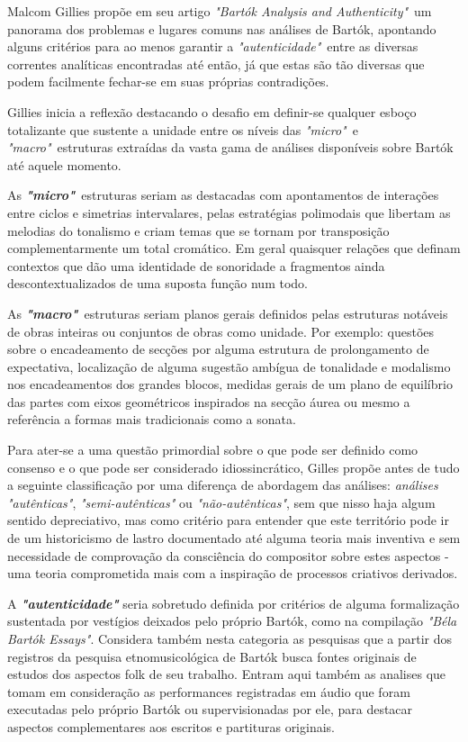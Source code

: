\documentclass[
	12pt,				%
	openright,			%
	twoside,			%
	a4paper,			%
	english,			%
	french,				%
	spanish,			%
	brazil				%
	]{abntex2}
\begin{document}
Malcom Gillies propõe em seu artigo \textit{"Bartók Analysis and Authenticity"}\cite{gillies1995bartok}\ um panorama dos problemas e lugares comuns nas análises de Bartók, apontando alguns critérios para ao menos garantir a \textit{"autenticidade"}\ entre as diversas correntes analíticas encontradas até então, já que estas são tão diversas que podem facilmente fechar-se em suas próprias contradições. 

Gillies inicia a reflexão destacando o desafio em definir-se qualquer esboço totalizante que sustente a unidade entre os níveis das \textit{ "micro"}\ e \textit{"macro"}\ estruturas extraídas da vasta gama de análises disponíveis sobre Bartók até aquele momento.

As \textit{ \textbf{"micro"}}\ estruturas seriam as destacadas com apontamentos de interações entre ciclos e simetrias intervalares, pelas estratégias polimodais que libertam as melodias do tonalismo e criam temas que se tornam por transposição complementarmente um total cromático. Em geral quaisquer relações que definam contextos que dão uma identidade de sonoridade a fragmentos ainda descontextualizados de uma suposta função num todo. 

As \textit{\textbf{"macro"}}\ estruturas seriam planos gerais definidos pelas estruturas notáveis de obras inteiras ou conjuntos de obras como unidade. Por exemplo: questões sobre o encadeamento de secções por alguma estrutura de prolongamento de expectativa, localização de alguma sugestão ambígua de tonalidade e modalismo nos encadeamentos dos grandes blocos, medidas gerais de um plano de equilíbrio das partes com eixos geométricos inspirados na secção áurea ou mesmo a referência a formas mais tradicionais como a sonata.

Para ater-se a uma questão primordial sobre o que pode ser definido como consenso e o que pode ser considerado idiossincrático, Gilles propõe antes de tudo a seguinte classificação por uma diferença de abordagem das análises: \textit{análises "autênticas"}, \textit{"semi-autênticas"} ou \textit{"não-autênticas"}, sem que nisso haja algum sentido depreciativo, mas como critério para entender que este território pode ir de um historicismo de lastro documentado até alguma teoria mais inventiva e sem necessidade de comprovação da consciência do compositor sobre estes aspectos - uma teoria comprometida mais com a inspiração de processos criativos derivados.

A \textit{\textbf{"autenticidade"}} seria sobretudo definida por critérios de alguma formalização sustentada por vestígios deixados pelo próprio Bartók, como na compilação \textit{"Béla Bartók Essays"}\cite{bartok1993bela}. Considera também nesta categoria as pesquisas que a partir dos registros da pesquisa etnomusicológica de Bartók busca fontes originais de estudos dos aspectos folk de seu trabalho. Entram aqui também as analises que tomam em consideração as performances registradas em áudio que foram executadas pelo próprio Bartók ou supervisionadas por ele, para destacar aspectos complementares aos escritos e partituras originais. 
\end{document}

